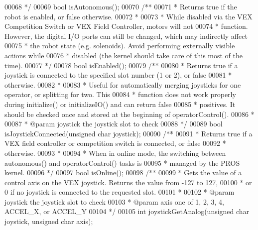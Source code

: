 \begin{DoxyCode}
00068 \textcolor{comment}{ */}
00069 \textcolor{keywordtype}{bool} isAutonomous();
00070 \textcolor{comment}{/**}
00071 \textcolor{comment}{ * Returns true if the robot is enabled, or false otherwise.}
00072 \textcolor{comment}{ *}
00073 \textcolor{comment}{ * While disabled via the VEX Competition Switch or VEX Field Controller, motors will not}
00074 \textcolor{comment}{ * function. However, the digital I/O ports can still be changed, which may indirectly affect}
00075 \textcolor{comment}{ * the robot state (e.g. solenoids). Avoid performing externally visible actions while}
00076 \textcolor{comment}{ * disabled (the kernel should take care of this most of the time).}
00077 \textcolor{comment}{ */}
00078 \textcolor{keywordtype}{bool} isEnabled();
00079 \textcolor{comment}{/**}
00080 \textcolor{comment}{ * Returns true if a joystick is connected to the specified slot number (1 or 2), or false}
00081 \textcolor{comment}{ * otherwise.}
00082 \textcolor{comment}{ *}
00083 \textcolor{comment}{ * Useful for automatically merging joysticks for one operator, or splitting for two. This}
00084 \textcolor{comment}{ * function does not work properly during initialize() or initializeIO() and can return false}
00085 \textcolor{comment}{ * positives. It should be checked once and stored at the beginning of operatorControl().}
00086 \textcolor{comment}{ *}
00087 \textcolor{comment}{ * @param joystick the joystick slot to check}
00088 \textcolor{comment}{ */}
00089 \textcolor{keywordtype}{bool} isJoystickConnected(\textcolor{keywordtype}{unsigned} \textcolor{keywordtype}{char} joystick);
00090 \textcolor{comment}{/**}
00091 \textcolor{comment}{ * Returns true if a VEX field controller or competition switch is connected, or false}
00092 \textcolor{comment}{ * otherwise.}
00093 \textcolor{comment}{ *}
00094 \textcolor{comment}{ * When in online mode, the switching between autonomous() and operatorControl() tasks is}
00095 \textcolor{comment}{ * managed by the PROS kernel.}
00096 \textcolor{comment}{ */}
00097 \textcolor{keywordtype}{bool} isOnline();
00098 \textcolor{comment}{/**}
00099 \textcolor{comment}{ * Gets the value of a control axis on the VEX joystick. Returns the value from -127 to 127,}
00100 \textcolor{comment}{ * or 0 if no joystick is connected to the requested slot.}
00101 \textcolor{comment}{ *}
00102 \textcolor{comment}{ * @param joystick the joystick slot to check}
00103 \textcolor{comment}{ * @param axis one of 1, 2, 3, 4, ACCEL\_X, or ACCEL\_Y}
00104 \textcolor{comment}{ */}
00105 \textcolor{keywordtype}{int} joystickGetAnalog(\textcolor{keywordtype}{unsigned} \textcolor{keywordtype}{char} joystick, \textcolor{keywordtype}{unsigned} \textcolor{keywordtype}{char} axis);

\end{DoxyCode}
